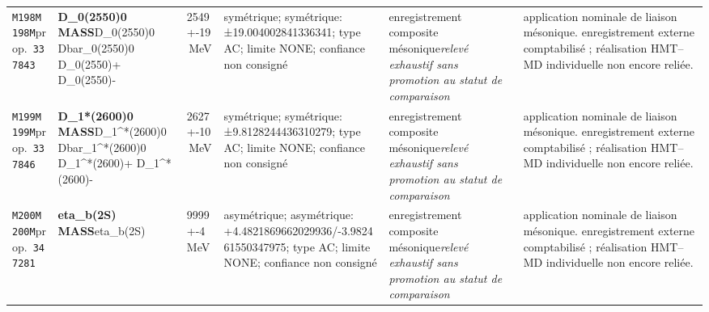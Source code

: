 \begin{landscape}
\begin{longtable}{L{1.85cm}L{4.45cm}L{2.35cm}L{4.05cm}L{3.35cm}L{7.15cm}}
\texttt{M198}\newline \texttt{M198M}\newline prop.\ \texttt{337843} & \textbf{D\_\allowbreak{}0(2550)0 MASS}\newline D\_\allowbreak{}0(2550)0 \textbar{}\allowbreak{} Dbar\_\allowbreak{}0(2550)0 \textbar{}\allowbreak{} D\_\allowbreak{}0(2550)+ \textbar{}\allowbreak{} D\_\allowbreak{}0(2550)- & 2549+-19\,MeV & symétrique; symétrique: ±19.004002841336341; type AC; limite NONE; confiance non consigné & enregistrement composite mésonique\newline \emph{relevé exhaustif sans promotion au statut de comparaison} & application nominale de liaison mésonique. enregistrement externe comptabilisé ; réalisation HMT--MD individuelle non encore reliée. \\
\texttt{M199}\newline \texttt{M199M}\newline prop.\ \texttt{337846} & \textbf{D\_\allowbreak{}1*(2600)0 MASS}\newline D\_\allowbreak{}1\textasciicircum{}*(2600)0 \textbar{}\allowbreak{} Dbar\_\allowbreak{}1\textasciicircum{}*(2600)0 \textbar{}\allowbreak{} D\_\allowbreak{}1\textasciicircum{}*(2600)+ \textbar{}\allowbreak{} D\_\allowbreak{}1\textasciicircum{}*(2600)- & 2627+-10\,MeV & symétrique; symétrique: ±9.8128244436310279; type AC; limite NONE; confiance non consigné & enregistrement composite mésonique\newline \emph{relevé exhaustif sans promotion au statut de comparaison} & application nominale de liaison mésonique. enregistrement externe comptabilisé ; réalisation HMT--MD individuelle non encore reliée. \\
\texttt{M200}\newline \texttt{M200M}\newline prop.\ \texttt{347281} & \textbf{eta\_\allowbreak{}b(2S) MASS}\newline eta\_\allowbreak{}b(2S) & 9999+-4\,MeV & asymétrique; asymétrique: +4.4821869662029936/-3.982461550347975; type AC; limite NONE; confiance non consigné & enregistrement composite mésonique\newline \emph{relevé exhaustif sans promotion au statut de comparaison} & application nominale de liaison mésonique. enregistrement externe comptabilisé ; réalisation HMT--MD individuelle non encore reliée. \\

\end{longtable}
\end{landscape}

